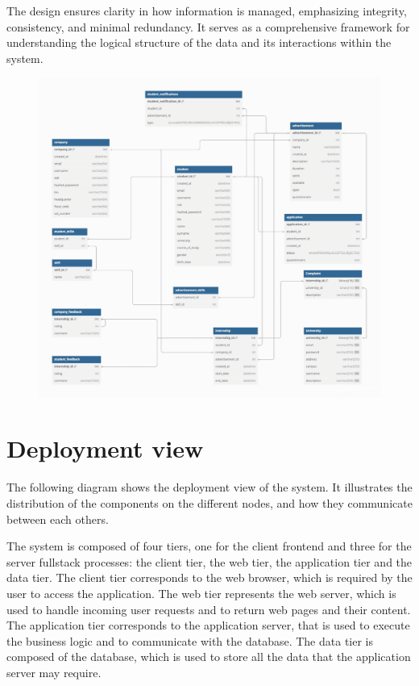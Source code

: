 The design ensures clarity in how information is managed, emphasizing integrity, consistency, and minimal redundancy.
It serves as a comprehensive framework for understanding the logical structure of the data and its interactions within the system.

\begin{figure}[H]
    \centering
    \includegraphics[width=0.8\linewidth]{../assets/er-diagrams/er-diagram.png}
\end{figure}

\section{Deployment view}

The following diagram shows the deployment view of the system.
It illustrates the distribution of the components on the different nodes, and how they communicate between each others.

The system is composed of four tiers, one for the client frontend and three for the server fullstack processes: the client tier, the web tier, the application tier and the data tier.
The client tier corresponds to the web browser, which is required by the user to access the application.
The web tier represents the web server, which is used to handle incoming user requests and to return web pages and their content.
The application tier corresponds to the application server, that is used to execute the business logic and to communicate with the database.
The data tier is composed of the database, which is used to store all the data that the application server may require.

